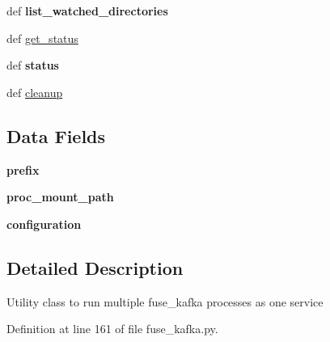 \begin{DoxyCompactItemize}
\item 
\hypertarget{classfuse__kafka_1_1FuseKafkaService_aa7dd2095cfc8b080fba7047654e92eb9}{def {\bfseries list\-\_\-watched\-\_\-directories}}\label{classfuse__kafka_1_1FuseKafkaService_aa7dd2095cfc8b080fba7047654e92eb9}

\item 
def \hyperlink{classfuse__kafka_1_1FuseKafkaService_a6e9278183d970e683d7060610bb9bc6f}{get\-\_\-status}
\item 
\hypertarget{classfuse__kafka_1_1FuseKafkaService_a0289d64b6f56aef8b710466042ada3d1}{def {\bfseries status}}\label{classfuse__kafka_1_1FuseKafkaService_a0289d64b6f56aef8b710466042ada3d1}

\item 
def \hyperlink{classfuse__kafka_1_1FuseKafkaService_a9cf98c6a35fb986e6877dfdca61630c0}{cleanup}
\end{DoxyCompactItemize}
\subsection*{\-Data \-Fields}
\begin{DoxyCompactItemize}
\item 
\hypertarget{classfuse__kafka_1_1FuseKafkaService_ae104081d0b1ec3c4c44cfd4ccf75b01e}{{\bfseries prefix}}\label{classfuse__kafka_1_1FuseKafkaService_ae104081d0b1ec3c4c44cfd4ccf75b01e}

\item 
\hypertarget{classfuse__kafka_1_1FuseKafkaService_a1238f08c265e4c19a8a721f57bd7dafe}{{\bfseries proc\-\_\-mount\-\_\-path}}\label{classfuse__kafka_1_1FuseKafkaService_a1238f08c265e4c19a8a721f57bd7dafe}

\item 
\hypertarget{classfuse__kafka_1_1FuseKafkaService_afd89f62981d0dcbb3efee6f56c949642}{{\bfseries configuration}}\label{classfuse__kafka_1_1FuseKafkaService_afd89f62981d0dcbb3efee6f56c949642}

\end{DoxyCompactItemize}


\subsection{\-Detailed \-Description}
\begin{DoxyVerb}Utility class to run multiple fuse_kafka processes as one service \end{DoxyVerb}
 

\-Definition at line 161 of file fuse\-\_\-kafka.\-py.



